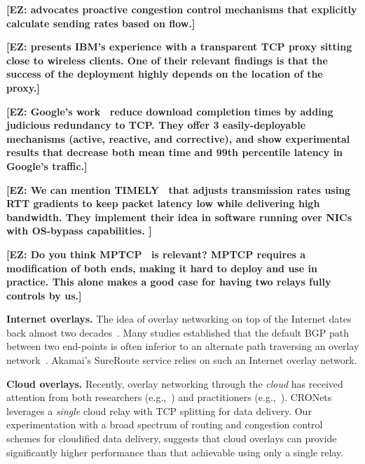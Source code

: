 \documentclass[10pt,sigconf]{acmart}
\newcommand{\mycomm}[3]{{\color{#2} \textbf{[#1: #3]}}}
\newcommand{\mycomm}[3]{}
\newcommand{\IK}[1]{\mycomm{IK}{blue}{#1}}
\newcommand{\EZ}[1]{\mycomm{EZ}{teal}{#1}}
\newcommand{\T}[1]{\smallskip\noindent\textbf{#1}} %
\begin{document}
\EZ{\cite{jose2015proactive} advocates proactive congestion control mechanisms that explicitly calculate sending rates based on flow.}

\EZ{\cite{le2015experiences} presents IBM's experience with a transparent TCP proxy sitting close to wireless clients. One of their relevant findings is that the success of the deployment highly depends on the location of the proxy.}

\EZ{Google's work~\cite{flach2013reducing} reduce download completion times by adding judicious redundancy to TCP. They offer 3 easily-deployable mechanisms (active, reactive, and corrective), and show experimental results that decrease both mean time and 99th percentile latency in Google's traffic.}

\EZ{We can mention TIMELY~\cite{mittal2015timely} that adjusts transmission rates using RTT gradients to keep packet latency low while delivering high bandwidth. They implement their idea in software running over NICs with OS-bypass capabilities.
}

\EZ{Do you think MPTCP~\cite{barre2010mptcp} is relevant? MPTCP requires a modification of both ends, making it hard to deploy and use in practice. This alone makes a good case for having two relays fully controls by us.}

\T{Internet overlays.} The idea of overlay networking on top of the Internet dates back almost two decades~\cite{old-overlay-1, old-overlay-2, RON}. Many studies established that the default BGP path between two end-points is often inferior to an alternate path traversing an overlay network~\cite{old-overlay-1, old-overlay-2, RON, akamai-2, akamai-3, akamai-4}. Akamai's SureRoute service relies on such an Internet overlay network.

\T{Cloud overlays.} Recently, overlay networking through the \emph{cloud} has received attention from both researchers (e.g.,~\cite{CRONets}) and practitioners (e.g.,~\cite{teridion}). CRONets~\cite{CRONets} leverages a \emph{single} cloud relay with TCP splitting for data delivery. Our experimentation with a broad spectrum of routing and congestion control schemes for cloudified data delivery, suggests that cloud overlays can provide significantly higher performance than that achievable using only a single relay.
\end{document}
